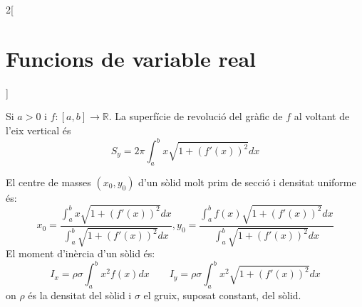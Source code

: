 \documentclass[../../../main.tex]{subfiles}
\begin{document}
\begin{multicols}{2}[\section{Funcions de variable real}]
\begin{prop}
\end{prop}
\begin{prop}
Si $a>0$ i $f:[a,b]\rightarrow\mathbb{R}$. La superfície de revolució del gràfic de $f$ al voltant de l'eix vertical és $$S_y=2\pi\int_a^bx\sqrt{1+(f'(x))^2}dx$$
\end{prop}
\begin{prop}
El centre de masses $(x_0,y_0)$ d'un sòlid molt prim de secció i densitat uniforme és: $$x_0=\frac{\int_a^bx\sqrt{1+(f'(x))^2}dx}{\int_a^b\sqrt{1+(f'(x))^2}dx},y_0=\frac{\int_a^b f(x)\sqrt{1+(f'(x))^2}dx}{\int_a^b\sqrt{1+(f'(x))^2}dx}$$
El moment d'inèrcia d'un sòlid és: $$I_x=\rho\sigma\int_a^bx^2f(x)dx\qquad I_y=\rho\sigma\int_a^bx^2\sqrt{1+(f'(x))^2}dx$$ on $\rho$ és la densitat del sòlid i $\sigma$ el gruix, suposat constant, del sòlid.
\end{prop}
\end{multicols}
\end{document}
